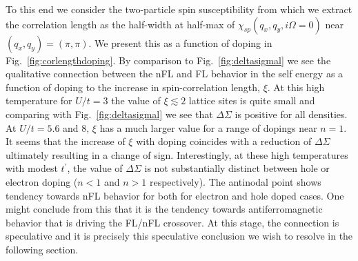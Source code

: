 \documentclass[twocolumn,notitlepage,prb,superscriptaddress,showpacs]{revtex4-1}
\begin{document}
To this end we consider the two-particle spin susceptibility\cite{hafermann:2008,chen:2017} from which we extract the correlation length as the half-width at half-max of $\chi_{sp}(q_x,q_y,i\Omega=0)$ near $(q_x,q_y)=(\pi,\pi)$.  We present this as a function of doping in Fig.~\ref{fig:corlengthdoping}.  By comparison to Fig.~\ref{fig:deltasigmal} we see the qualitative connection between the nFL and FL behavior in the self energy as a function of doping to the increase in spin-correlation length, $\xi$.  
At this high temperature for $U/t=3$ the value of $\xi \lesssim 2$ lattice sites is quite small and comparing with Fig.~\ref{fig:deltasigmal} we see that $\Delta \Sigma$ is positive for all densities.  At $U/t=5.6$ and 8, $\xi$ has a much larger value for a range of dopings near $n=1$.  It seems that the increase of $\xi$ with doping coincides with a reduction of $\Delta \Sigma$ ultimately resulting in a change of sign.  Interestingly, at these high temperatures with modest $t^\prime$, the value of $\Delta \Sigma$ is not substantially distinct between hole or electron doping ($n<1$ and $n>1$ respectively).  The antinodal point shows tendency towards nFL behavior for both for electron and hole doped cases. 
One might conclude from this that it is the tendency towards antiferromagnetic behavior that is driving the FL/nFL crossover.  At this stage, the connection is speculative and it is precisely this speculative conclusion we wish to resolve in the following section. 
\end{document}
